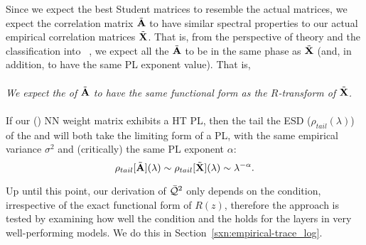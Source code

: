 
Since we expect the best Student matrices to resemble the actual \Teacher matrices, we expect the \Student correlation matrix $\tilde{\mathbf{A}}$ to have similar spectral properties to our actual empirical correlation matrices $\tilde{\mathbf{X}}$.
That is, from the perspective of \HTSR theory and the classification into \PhasesOfTraining~\cite{MM18_TR_JMLRversion}, we expect all the $\tilde{\mathbf{A}}$ to be in the same phase as $\tilde{\mathbf{X}}$ (and, in addition, to have the same PL exponent value).   That is, 
\\
\\
\emph{We expect the \RTransform of $\tilde{\mathbf{A}}$ to have the same functional form as the $R$-transform of $\tilde{\mathbf{X}}$.}
\\
\\
If our (\Teacher) NN weight matrix exhibits a HT PL, then the tail the ESD ($\rho_{tail}(\lambda)$) of the \Student and \Teacher will both take the limiting form of a PL, with the same empirical variance $\sigma^{2}$ and (critically) the same PL exponent $\alpha$:
\begin{equation}
\label{eqn:R_PL}
  \rho_{tail}[\tilde{\mathbf{A}}](\lambda)\sim\rho_{tail}[\tilde{\mathbf{X}}](\lambda)\sim\lambda^{-\alpha}.
\end{equation}

Up until this point, our derivation of $\bar{\mathcal{Q}}^{2}$ only depends on the \TRACELOG condition, irrespective of the exact functional form of $R(z)$,
therefore the \SETOL approach is tested by examining how well the \TRACELOG condition and the \ECS holds for the layers in very well-performing models.
We do this in Section~\ref{sxn:empirical-trace_log}.






